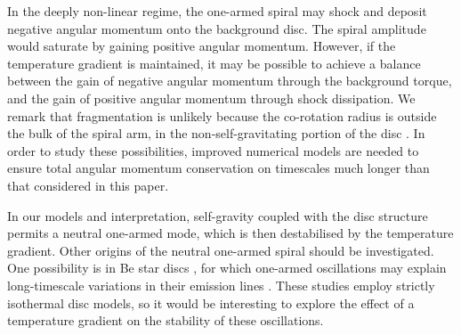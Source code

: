 In the deeply non-linear regime, the one-armed spiral may 
shock and deposit negative angular momentum onto
the background disc. The spiral amplitude would saturate by gaining
positive angular momentum. However, if the temperature gradient is
maintained, it may be possible to achieve a balance between the gain
of negative angular momentum through the background torque, and the
gain of positive angular momentum through shock dissipation. We remark  
that fragmentation is unlikely because the co-rotation radius 
is outside the bulk of the spiral arm, in the non-self-gravitating
portion of the disc \citep{durisen08}. In order
to study these possibilities, improved numerical models are needed to
ensure total angular momentum conservation on timescales much longer
than that considered in this paper. 


In our models and interpretation, self-gravity coupled with the disc 
structure permits a neutral one-armed mode, which is then
destabilised by the temperature gradient. Other origins of the neutral
one-armed spiral should be investigated. One possibility is in Be star discs
\citep{rivinius13}, for which 
one-armed oscillations may explain long-timescale variations in their
emission lines \citep[see e.g.][and references
therein]{okasaki97,papaloizou06c,ogilvie08}. These studies employ
strictly isothermal disc models, so it would be interesting to explore
the effect of a temperature gradient on the stability of these
oscillations. 



